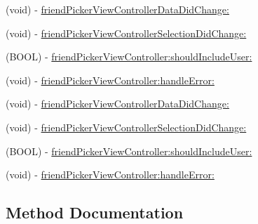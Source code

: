 \begin{DoxyCompactItemize}
\item 
(void) -\/ \hyperlink{protocolFBFriendPickerDelegate_01-p_adb573d4fc9792d3dc05298f13bc41086}{friend\+Picker\+View\+Controller\+Data\+Did\+Change\+:}
\item 
(void) -\/ \hyperlink{protocolFBFriendPickerDelegate_01-p_a6b00500fbc7158e7b0b0155b44cd02f5}{friend\+Picker\+View\+Controller\+Selection\+Did\+Change\+:}
\item 
(B\+O\+OL) -\/ \hyperlink{protocolFBFriendPickerDelegate_01-p_a7c521c53cb2cace336ac14fb4d111f89}{friend\+Picker\+View\+Controller\+:should\+Include\+User\+:}
\item 
(void) -\/ \hyperlink{protocolFBFriendPickerDelegate_01-p_ac4b023444722c5b44144284f593c8f67}{friend\+Picker\+View\+Controller\+:handle\+Error\+:}
\item 
(void) -\/ \hyperlink{protocolFBFriendPickerDelegate_01-p_adb573d4fc9792d3dc05298f13bc41086}{friend\+Picker\+View\+Controller\+Data\+Did\+Change\+:}
\item 
(void) -\/ \hyperlink{protocolFBFriendPickerDelegate_01-p_a6b00500fbc7158e7b0b0155b44cd02f5}{friend\+Picker\+View\+Controller\+Selection\+Did\+Change\+:}
\item 
(B\+O\+OL) -\/ \hyperlink{protocolFBFriendPickerDelegate_01-p_a7c521c53cb2cace336ac14fb4d111f89}{friend\+Picker\+View\+Controller\+:should\+Include\+User\+:}
\item 
(void) -\/ \hyperlink{protocolFBFriendPickerDelegate_01-p_ac4b023444722c5b44144284f593c8f67}{friend\+Picker\+View\+Controller\+:handle\+Error\+:}
\end{DoxyCompactItemize}


\subsection{Method Documentation}
\mbox{\label{protocolFBFriendPickerDelegate_01-p_ac4b023444722c5b44144284f593c8f67}} 
